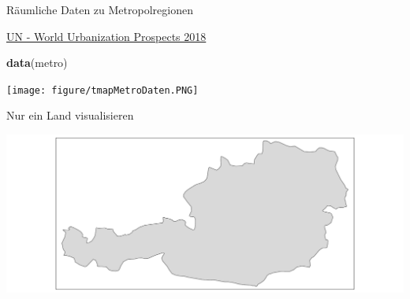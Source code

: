 \documentclass[ignorenonframetext,]{beamer}
\newenvironment{Shaded}{\begin{snugshade}}{\end{snugshade}}
\newcommand{\KeywordTok}[1]{\textcolor[rgb]{0.13,0.29,0.53}{\textbf{#1}}}
\newcommand{\StringTok}[1]{\textcolor[rgb]{0.31,0.60,0.02}{#1}}
\newcommand{\OperatorTok}[1]{\textcolor[rgb]{0.81,0.36,0.00}{\textbf{#1}}}
\newcommand{\NormalTok}[1]{#1}
\begin{document}
\begin{frame}[fragile]{Räumliche Daten zu Metropolregionen}

\begin{block}{\href{https://population.un.org/wup/}{UN - World
Urbanization Prospects 2018}}

\begin{Shaded}
\begin{Highlighting}[]
\KeywordTok{data}\NormalTok{(metro)}
\end{Highlighting}
\end{Shaded}

\texttt{[image: figure/tmapMetroDaten.PNG]}

\end{block}

\end{frame}

\begin{frame}[fragile]{Nur ein Land visualisieren}

\begin{Shaded}
\end{Shaded}

\includegraphics{tmap_files/figure-beamer/unnamed-chunk-44-1.pdf}

\end{frame}
\end{document}
